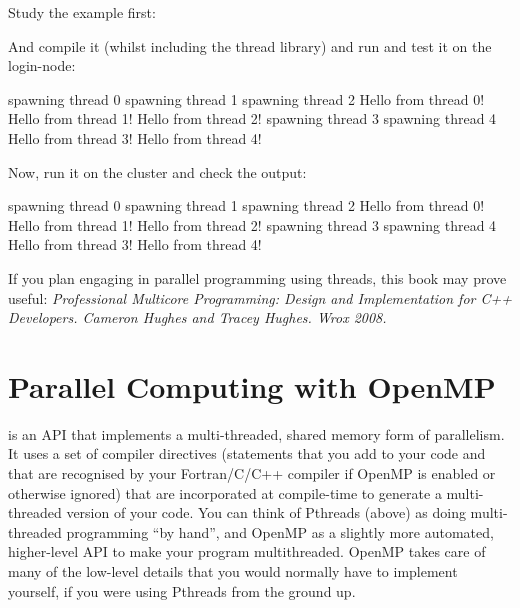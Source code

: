 Study the example first:


And compile it (whilst including the thread library) and run and test it on the login-node:

\begin{prompt}
spawning thread 0
spawning thread 1
spawning thread 2
Hello from thread 0!
Hello from thread 1!
Hello from thread 2!
spawning thread 3
spawning thread 4
Hello from thread 3!
Hello from thread 4!
\end{prompt}

Now, run it on the cluster and check the output:

\begin{prompt}
spawning thread 0
spawning thread 1
spawning thread 2
Hello from thread 0!
Hello from thread 1!
Hello from thread 2!
spawning thread 3
spawning thread 4
Hello from thread 3!
Hello from thread 4!
\end{prompt}

\begin{tip}
If you plan engaging in parallel programming using threads,
this book may prove useful: \emph{Professional Multicore Programming: Design
and Implementation for C++ Developers. Cameron Hughes and Tracey Hughes. Wrox
2008.}
\end{tip}

\section{Parallel Computing with OpenMP}

 is an API that implements a multi-threaded, shared
memory form of parallelism. It uses a set of compiler directives (statements
that you add to your code and that are recognised by your Fortran/C/C++
compiler if OpenMP is enabled or otherwise ignored) that are incorporated at
compile-time to generate a multi-threaded version of your code. You can think
of Pthreads (above) as doing multi-threaded programming ``by hand'', and OpenMP
as a slightly more automated, higher-level API to make your program
multithreaded. OpenMP takes care of many of the low-level details that you
would normally have to implement yourself, if you were using Pthreads from the
ground up.

